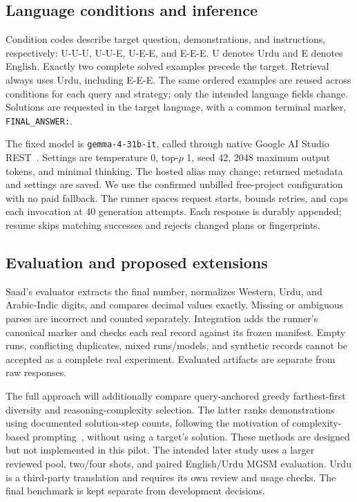 \documentclass[conference]{IEEEtran}
\begin{document}
\subsection{Language conditions and inference}
Condition codes describe target question, demonstrations, and instructions, respectively: U-U-U, U-U-E, U-E-E, and E-E-E. U denotes Urdu and E denotes English. Exactly two complete solved examples precede the target. Retrieval always uses Urdu, including E-E-E. The same ordered examples are reused across conditions for each query and strategy; only the intended language fields change. Solutions are requested in the target language, with a common terminal marker, \texttt{FINAL\_ANSWER:}.

The fixed model is \texttt{gemma-4-31b-it}, called through native Google AI Studio REST~\cite{gemma}. Settings are temperature 0, top-$p$ 1, seed 42, 2048 maximum output tokens, and minimal thinking. The hosted alias may change; returned metadata and settings are saved. We use the confirmed unbilled free-project configuration with no paid fallback. The runner spaces request starts, bounds retries, and caps each invocation at 40 generation attempts. Each response is durably appended; resume skips matching successes and rejects changed plans or fingerprints.

\subsection{Evaluation and proposed extensions}
Saad's evaluator extracts the final number, normalizes Western, Urdu, and Arabic-Indic digits, and compares decimal values exactly. Missing or ambiguous parses are incorrect and counted separately. Integration adds the runner's canonical marker and checks each real record against its frozen manifest. Empty runs, conflicting duplicates, mixed runs/models, and synthetic records cannot be accepted as a complete real experiment. Evaluated artifacts are separate from raw responses.

The full approach will additionally compare query-anchored greedy farthest-first diversity and reasoning-complexity selection. The latter ranks demonstrations using documented solution-step counts, following the motivation of complexity-based prompting~\cite{fu}, without using a target's solution. These methods are designed but not implemented in this pilot. The intended later study uses a larger reviewed pool, two/four shots, and paired English/Urdu MGSM evaluation. Urdu is a third-party translation and requires its own review and usage checks. The final benchmark is kept separate from development decisions.
\end{document}
